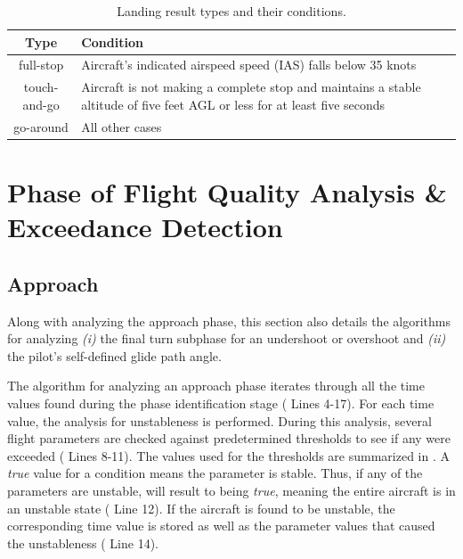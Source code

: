     \begin{table}
        \caption{\small{Landing result types and their conditions.}}
        \label{tab:landing_types}
        \vspace{3pt}
        \centering
        \begin{tabular}{@{} c m{.70\linewidth} @{}}
            \hline
            \bfseries Type & \bfseries Condition \\ \hline
            full-stop    & Aircraft's indicated airspeed speed (IAS) falls below 35 knots \\ \hline
            touch-and-go & Aircraft is not making a complete stop and maintains a stable altitude of five feet AGL or less for at least five seconds \\ \hline
            go-around    & All other cases \\ \hline
        \end{tabular}
    \end{table}
    

\section{Phase of Flight Quality Analysis \& Exceedance Detection} \label{sec:phase_quality}
    
	\subsection{Approach}
        
        Along with analyzing the approach phase, this section also details the algorithms for analyzing \textit{(i)} the final turn subphase for an undershoot or overshoot and \textit{(ii)} the pilot's self-defined glide path angle.
        
        The algorithm for analyzing an approach phase iterates through all the time values found during the phase identification stage ( Lines 4-17).  For each time value, the analysis for unstableness is performed.  During this analysis, several flight parameters are checked against predetermined thresholds to see if any were exceeded ( Lines 8-11).  The values used for the thresholds are summarized in .  A \textit{true} value for a condition means the parameter is stable.  Thus, if any of the parameters are unstable,  will result to being \textit{true}, meaning the entire aircraft is in an unstable state ( Line 12).  If the aircraft is found to be unstable, the corresponding time value is stored as well as the parameter values that caused the unstableness ( Line 14).
        
